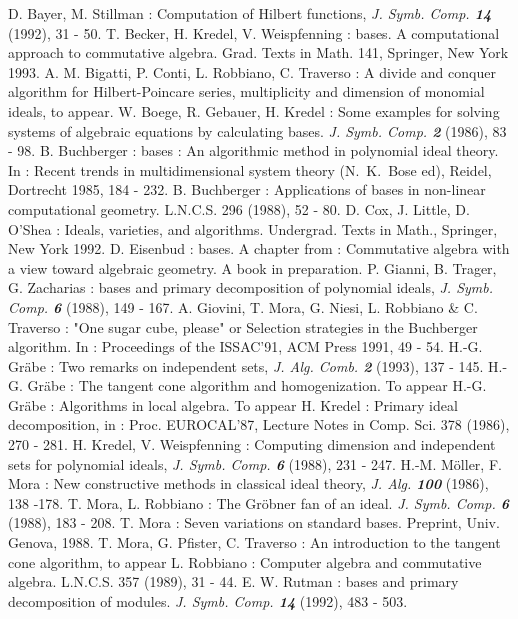 \begin{thebibliography}{xxx}
 D. Bayer, M. Stillman : Computation of Hilbert
functions, {\it J. Symb. Comp. \bf 14} (1992), 31 - 50.
 T. Becker, H. Kredel, V. Weispfenning : \gr bases. A
computational approach to commutative algebra. Grad. Texts in Math.
141, Springer, New York 1993.
 A. M. Bigatti, P. Conti, L. Robbiano, C. Traverso : A
divide and conquer algorithm for Hilbert-Poincare series,
multiplicity and dimension of monomial ideals, to appear.
 W. Boege, R. Gebauer, H. Kredel : Some examples for
solving systems of algebraic equations by calculating \gr bases. {\it
J. Symb. Comp. \bf 2} (1986), 83 - 98.
 B. Buchberger : \gr bases : An algorithmic method in
polynomial ideal theory. In : Recent trends in multidimensional
system theory (N.~K.~Bose ed), Reidel, Dortrecht 1985, 184 - 232.
 B. Buchberger : Applications of \gr bases in non-linear
computational geometry. L.N.C.S. 296 (1988), 52 - 80.
 D. Cox, J. Little, D. O'Shea : Ideals, varieties, and
algorithms.  Undergrad. Texts in Math., Springer, New York 1992.
 D. Eisenbud : \gr bases. A chapter from :
Commutative algebra with a view toward algebraic geometry.
A book in preparation.
 P. Gianni, B. Trager, G. Zacharias : \gr bases and
primary decomposition of polynomial ideals, {\it J. Symb. Comp. \bf
6} (1988), 149 - 167.
 A. Giovini, T. Mora, G. Niesi, L. Robbiano \& C.
Traverso : "One sugar cube, please" or Selection strategies in the
Buchberger algorithm. In : Proceedings of the ISSAC'91, ACM Press
1991, 49 - 54.
 H.-G. Gr\"abe : Two remarks on independent sets, 
{\it J. Alg. Comb. \bf 2} (1993), 137 - 145. 
 H.-G. Gr\"abe : The tangent cone algorithm and
homogenization. To appear
 H.-G. Gr\"abe : Algorithms in local algebra. To appear
 H. Kredel : Primary ideal decomposition, in : Proc.
EUROCAL'87, Lecture Notes in Comp. Sci. 378 (1986), 270 - 281.
 H. Kredel, V. Weispfenning : Computing dimension and
independent sets for polynomial ideals, {\it J. Symb. Comp. \bf 6} 
(1988), 231 - 247.
 H.-M. M\"oller, F. Mora : New constructive methods in
classical ideal theory, {\it J. Alg. \bf 100} (1986), 138 -178.
 T. Mora, L. Robbiano : The Gr\"obner fan of an ideal.
{\it J. Symb. Comp. \bf 6} (1988), 183 - 208.
 T. Mora : Seven variations on standard bases. 
Preprint, Univ. Genova, 1988.
 T. Mora, G. Pfister, C. Traverso : An introduction to
the tangent cone algorithm, to appear
 L. Robbiano : Computer algebra and commutative algebra.
L.N.C.S. 357 (1989), 31 - 44.
 E. W. Rutman : \gr bases and primary decomposition of
modules. {\it J. Symb. Comp. \bf 14} (1992), 483 - 503.

\end{thebibliography}





